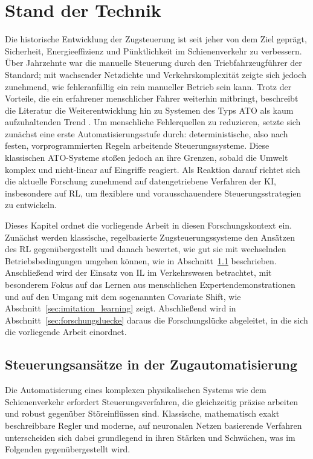 \section{Stand der Technik}
\label{sec:stand_der_technik}

Die historische Entwicklung der Zugsteuerung ist seit jeher von dem Ziel geprägt, Sicherheit, Energieeffizienz und Pünktlichkeit im Schienenverkehr zu verbessern. Über Jahrzehnte war die manuelle Steuerung durch den Triebfahrzeugführer der Standard; mit wachsender Netzdichte und Verkehrskomplexität zeigte sich jedoch zunehmend, wie fehleranfällig ein rein manueller Betrieb sein kann. Trotz der Vorteile, die ein erfahrener menschlicher Fahrer weiterhin mitbringt, beschreibt die Literatur die Weiterentwicklung hin zu Systemen des Typs \gls{ATO} als kaum aufzuhaltenden Trend \cite[vgl.~S.~1]{chap3_Liu19}. Um menschliche Fehlerquellen zu reduzieren, setzte sich zunächst eine erste Automatisierungsstufe durch: deterministische, also nach festen, vorprogrammierten Regeln arbeitende Steuerungssysteme. Diese klassischen \gls{ATO}-Systeme stoßen jedoch an ihre Grenzen, sobald die Umwelt komplex und nicht-linear auf Eingriffe reagiert. Als Reaktion darauf richtet sich die aktuelle Forschung zunehmend auf datengetriebene Verfahren der \gls{KI}, insbesondere auf \gls{RL}, um flexiblere und vorausschauendere Steuerungsstrategien zu entwickeln.

Dieses Kapitel ordnet die vorliegende Arbeit in diesen Forschungskontext ein. Zunächst werden klassische, regelbasierte Zugsteuerungssysteme den Ansätzen des \gls{RL} gegenübergestellt und danach bewertet, wie gut sie mit wechselnden Betriebsbedingungen umgehen können, wie in Abschnitt~\ref{sec:konventionell_und_rl} beschrieben. Anschließend wird der Einsatz von \gls{IL} im Verkehrswesen betrachtet, mit besonderem Fokus auf das Lernen aus menschlichen Expertendemonstrationen und auf den Umgang mit dem sogenannten Covariate Shift, wie Abschnitt~\ref{sec:imitation_learning} zeigt. Abschließend wird in Abschnitt~\ref{sec:forschungsluecke} daraus die Forschungslücke abgeleitet, in die sich die vorliegende Arbeit einordnet.
\subsection{Steuerungsansätze in der Zugautomatisierung}
\label{sec:konventionell_und_rl}

Die Automatisierung eines komplexen physikalischen Systems wie dem Schienenverkehr erfordert Steuerungsverfahren, die gleichzeitig präzise arbeiten und robust gegenüber Störeinflüssen sind. Klassische, mathematisch exakt beschreibbare Regler und moderne, auf neuronalen Netzen basierende Verfahren unterscheiden sich dabei grundlegend in ihren Stärken und Schwächen, was im Folgenden gegenübergestellt wird.

